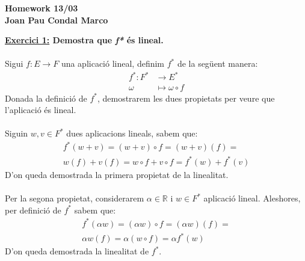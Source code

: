 \documentclass[a4paper, 11pt]{article}
\begin{document}
    \begin{center}
        \Large
        \textbf{
            Homework 13/03\\
            Joan Pau Condal Marco\\
        }
    \end{center}

    \noindent\textbf{\large \underline{Exercici 1:} \normalsize Demostra que \emph{f*} \'es lineal.}\\\\
    Sigui $ f: E \longrightarrow F $ una aplicació lineal, definim $f^*$ de la seg\"uent manera:
    \begin{align*}
        f^*: F^* &\longrightarrow E^*\\
        \omega &\mapsto \omega \circ f
    \end{align*}
    Donada la definici\'o de $ f^* $, demostrarem les dues propietats per veure que l'aplicaci\'o \'es lineal.\\\\
    Siguin $ w,v \in F^* $ dues aplicacions lineals, sabem que:
    \begin{gather*}
        f^* (w+v) = (w+v) \circ f = (w+v)(f) =\\
        w(f) + v(f) = w \circ f + v \circ f = f^*(w) + f^*(v)
    \end{gather*}
    D'on queda demostrada la primera propietat de la linealitat.\\\\
    Per la segona propietat, considerarem $ \alpha \in \mathbb{R} \text{ i } w \in F^* $ aplicaci\'o lineal. Aleshores, per definici\'o de $ f^* $ sabem que:
    \begin{gather*}
        f^*(\alpha w) = (\alpha w) \circ f = (\alpha w)(f) =\\
        \alpha w(f) = \alpha (w \circ f) = \alpha f^*(w)
    \end{gather*}
    D'on queda demostrada la linealitat de $ f^* $.\\\\
\end{document}
